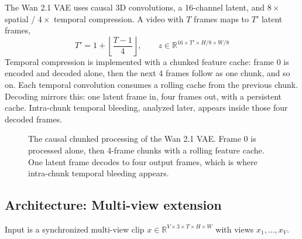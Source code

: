 The Wan 2.1 VAE uses causal 3D convolutions, a 16-channel latent, and $8\times$ spatial / $4\times$ temporal compression. A video with $T$ frames maps to $T'$ latent frames,
\begin{equation}
T' = 1 + \left\lfloor \frac{T-1}{4} \right\rfloor,
\qquad
z \in \mathbb{R}^{16 \times T' \times H/8 \times W/8}
\label{eq:wan_latent}
\end{equation}
Temporal compression is implemented with a chunked feature cache: frame 0 is encoded and decoded alone, then the next 4 frames follow as one chunk, and so on. Each temporal convolution consumes a rolling cache from the previous chunk. Decoding mirrors this: one latent frame in, four frames out, with a persistent cache. Intra-chunk temporal bleeding, analyzed later, appears inside those four decoded frames.

\begin{figure}[t]
\centering
{}
\caption{The causal chunked processing of the Wan 2.1 VAE. Frame 0 is processed alone, then 4-frame chunks with a rolling feature cache. One latent frame decodes to four output frames, which is where intra-chunk temporal bleeding appears.}
\label{fig:chunking}
\end{figure}

\subsection{Architecture: Multi-view extension}

Input is a synchronized multi-view clip $x \in \mathbb{R}^{V \times 3 \times T \times H \times W}$ with views $x_1, \dots, x_V$.

